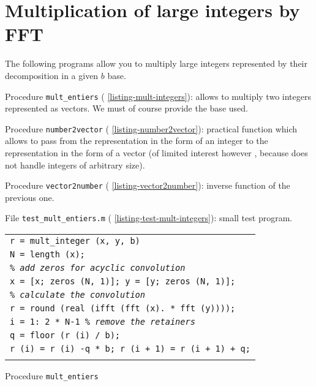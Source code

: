 \section{Multiplication of large integers by FFT}
\label{sect1-listing-mult-integers}
 
 The following \Matlab{} programs allow you to multiply large integers represented by their decomposition in a given $ b $ base. \begin{rs}
\item Procedure \texttt{mult\_entiers} (\listingterme{} \ref{listing-mult-integers}): allows to multiply two integers represented as vectors. We must of course provide the base used.
\item Procedure \texttt{number2vector} (\listingterme{} \ref{listing-number2vector}): practical function which allows to pass from the representation in the form of an integer to the representation in the form of a vector (of limited interest however , because \Matlab{} does not handle integers of arbitrary size).
\item Procedure \texttt{vector2number} (\listingterme{} \ref{listing-vector2number}): inverse function of the previous one.
\item File \texttt{test\_mult\_entiers.m} (\listingterme{} \ref{listing-test-mult-integers}): small test program.
\end{rs}
\begin{listing} \begin{footnotesize}
 
 
\noindent
{\upshape
\begin{tabular}{l} \texttt{\pfunction r = mult\_integer (x, y, b)} \\
\texttt{N = length (x);} \\
\texttt{\textit{\% add zeros for acyclic convolution}} \\
\texttt{x = [x; zeros (N, 1)]; y = [y; zeros (N, 1)];} \\
\texttt{\textit{\% calculate the convolution}} \\
\texttt{r = round (real (ifft (fft (x). * fft (y))));} \\
\texttt{\pfor i = 1: 2 * N-1 \textit{\% remove the retainers}} \\
\quad \texttt{q = floor (r (i) / b);} \\
\quad \texttt{r (i) = r (i) -q * b; r (i + 1) = r (i + 1) + q;} \\
\texttt{\pend} \\
\end{tabular}
}
 
\noindent \end{footnotesize}
 
\caption{Procedure \texttt{\upshape mult\_entiers}}
 
\label{listing-mult-integers}
\end{listing}
 
